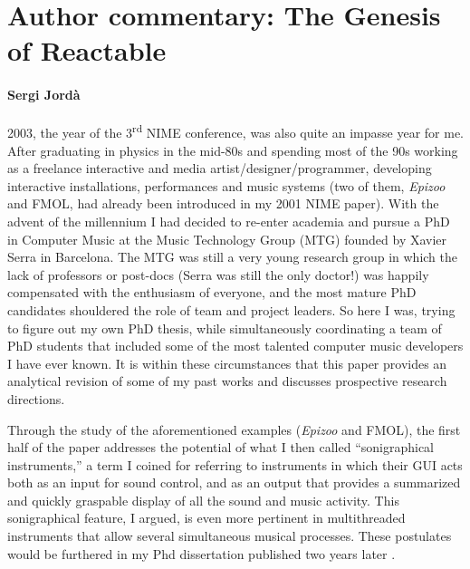 \section*{Author commentary: The Genesis of Reactable}
\paragraph{Sergi Jord\`{a}}

2003, the year of the 3\textsuperscript{rd} NIME conference, was also quite an impasse year for me. After graduating in physics in the mid-80s and spending most of the 90s working as a freelance interactive and media artist/designer/programmer, developing interactive installations, performances and music systems (two of them, \textit{Epizoo} and FMOL, had already been introduced in my 2001 NIME paper). With the advent of the millennium I had decided to re-enter academia and pursue a PhD in Computer Music at the Music Technology Group (MTG) founded by Xavier Serra in Barcelona. The MTG was still a very young research group in which the lack of professors or post-docs (Serra was still the only doctor!) was happily compensated with the enthusiasm of everyone, and the most mature PhD candidates shouldered the role of team and project leaders. So here I was, trying to figure out my own PhD thesis, while simultaneously coordinating a team of PhD students that included some of the most talented computer music developers I have ever known. It is within these circumstances that this paper provides an analytical revision of some of my past works and discusses  prospective research directions.

Through the study of the aforementioned examples (\textit{Epizoo} and FMOL), the first half of the paper addresses the potential of what I then called ``sonigraphical instruments,'' a term I coined for referring to instruments in which their GUI acts both as an input for sound control, and as an output that provides a summarized and quickly graspable display of all the sound and music activity. This sonigraphical feature, I argued, is even more pertinent in multithreaded instruments that allow several simultaneous musical processes. These postulates would be furthered in my Phd dissertation published two years later \cite{Jorda:2005}. 

